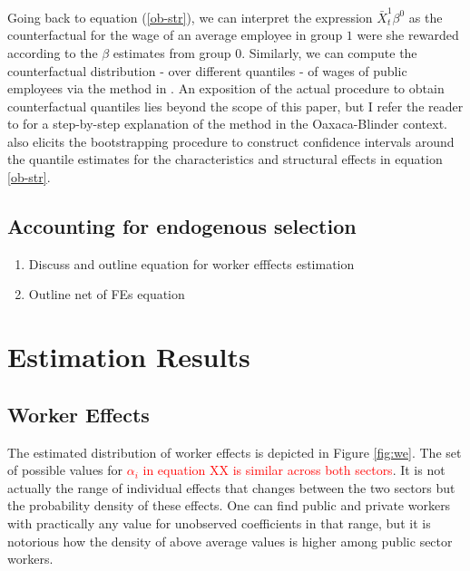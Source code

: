 \documentclass{article}
\begin{document}
\noindent
Going back to equation (\ref{ob-str}), we can interpret the expression $\bar{X}_{t}^{1}\beta^{0}$ as the counterfactual for the wage of an average employee in group $1$ were she rewarded according to the $\beta$ estimates from group $0$. Similarly, we can compute the counterfactual distribution - over different quantiles - of wages of public employees via the method in \cite{chernozhukov_inference_2013}. An exposition of the actual procedure to obtain counterfactual quantiles lies beyond the scope of this paper, but I refer the reader to \cite{hospido_public_2016} for a step-by-step explanation of the method in the Oaxaca-Blinder context. \cite{chernozhukov_inference_2013} also elicits the bootstrapping procedure to construct confidence intervals around the quantile estimates for the characteristics and structural effects in equation \ref{ob-str}.    \\

\subsection{Accounting for endogenous selection} \label{section:end-sel}
\begin{enumerate}
    \item Discuss \cite{canay_simple_2011} and outline equation for worker efffects estimation
    \item Outline net of FEs equation 
\end{enumerate}

\section{Estimation Results}
\subsection{Worker Effects}
The estimated distribution of worker effects is depicted in Figure \ref{fig:we}. The set of possible values for \textcolor{red}{$\alpha_i$ in equation XX is similar across both sectors}. It is not actually the range of individual effects that changes between the two sectors but the probability density of these effects. One can find public and private workers with practically any value for unobserved coefficients in that range, but it is notorious how the density of above average values is higher among public sector workers.\\
\end{document}
